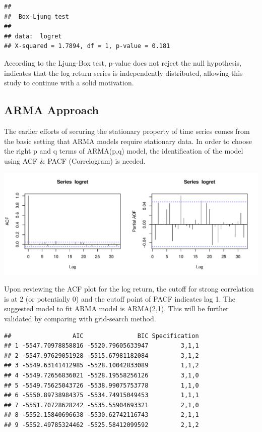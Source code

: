 \documentclass[
  11pt,
]{article}
\begin{document}
\begin{verbatim}
## 
##  Box-Ljung test
## 
## data:  logret
## X-squared = 1.7894, df = 1, p-value = 0.181
\end{verbatim}

According to the Ljung-Box test, p-value does not reject the null
hypothesis, indicates that the log return series is independently
distributed, allowing this study to continue with a solid motivation.

\hypertarget{arma-approach}{%
\subsection{ARMA Approach}\label{arma-approach}}

The earlier efforts of securing the stationary property of time series
comes from the basic setting that ARMA models require stationary data.
In order to choose the right p and q terms of ARMA(p,q) model, the
identification of the model using ACF \& PACF (Correlogram) is needed.

\includegraphics{ST436_Project_files/figure-latex/unnamed-chunk-15-1.pdf}

Upon reviewing the ACF plot for the log return, the cutoff for strong
correlation is at 2 (or potentially 0) and the cutoff point of PACF
indicates lag 1. The suggested model to fit ARMA model is ARMA(2,1).
This will be further validated by comparing with grid-search method.

\begin{verbatim}
##                 AIC               BIC Specification
## 1 -5547.70978858816 -5520.79605633947         3,1,1
## 2 -5547.97629051928 -5515.67981182084         3,1,2
## 3 -5549.63141412985 -5528.10042833089         1,1,2
## 4 -5549.72656836021 -5528.19558256126         3,1,0
## 5 -5549.75625043726 -5538.99075753778         1,1,0
## 6 -5550.89738984375 -5534.74915049453         1,1,1
## 7 -5551.70728628242 -5535.55904693321         2,1,0
## 8 -5552.15840696638 -5530.62742116743         2,1,1
## 9 -5552.49785324462 -5525.58412099592         2,1,2
\end{verbatim}
\end{document}
